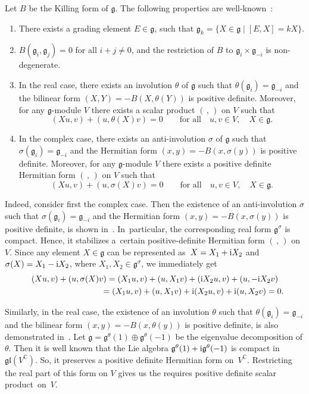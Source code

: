 \documentclass[pdftex]{sigma}%
\newcommand{\C}{\mathbb C}
\newcommand{\g}{\mathfrak g}
\newcommand{\gl}{\mathfrak{gl}}
\newcommand{\V}{V}
\numberwithin{equation}{section}
\begin{document}
\smallskip
Let $B$ be the Killing form of $\g$. The following properties are well-known~\cite{capslovak}:
\begin{enumerate}\itemsep=0pt
	\item There exists a grading element $E\in \g$, such that $\g_k=\{X\in\g\mid
	[E,X]=kX\}$.
	\item $B(\g_i,\g_j)=0$ for all $i+j\ne0$, and the restriction of $B$ to
	$\g_i\times\g_{-i}$ is non-degenerate.
	\item In the real case, there exists an involution $\theta$ of $\g$
	such that $\theta(\g_i)=\g_{-i}$ and the bilinear form $(X,Y)=-B(X,\theta(Y))$
	is positive definite. Moreover, for any $\g$-module $\V$ there exists a scalar
	product $(\,,\,)$ on $\V$ such that
	\[
	(Xu,v) + (u,\theta(X)v) = 0\qquad\text{for all}\quad u,v\in V,\quad X \in\g.
	\]
	\item In the complex case, there exists an anti-involution $\sigma$ of $\g$ such that
	$\sigma(\g_i)=\g_{-i}$ and the Hermitian form $(x,y)=-B(x,\sigma(y))$ is
	positive definite. Moreover, for any $\g$-module $\V$ there exists a positive
	definite Hermitian form $(\,,\,)$ on $\V$ such that
	\[
	(Xu,v) + (u,\sigma(X)v) = 0\qquad\text{for all}\quad u,v\in V,\quad X \in\g.
	\]
\end{enumerate}

Indeed, consider first the complex case. Then the existence of an anti-involution $\sigma$ such that $\sigma(\g_i)=\g_{-i}$ and the Hermitian form $(x,y)=-B(x,\sigma(y))$ is positive definite, is shown in~\cite[Lemma~1.5]{tan79}. In~particular, the corresponding real form $\g^{\sigma}$ is compact. Hence, it stabilizes a~certain positive-definite Hermitian form $(\,,\,)$ on~$\V$. Since any element $X\in \g$ can be represented as~$X=X_1+{\rm i}X_2$ and $\sigma(X)=X_1-{\rm i}X_2$, where $X_1,X_2\in \g^\sigma$, we immediately get
\begin{gather*}
(Xu,v) + (u,\sigma(X)v) = (X_1u,v) + (u,X_1v) + ({\rm i}X_2u,v)+(u,-{\rm i}X_2v)
\\ \hphantom{(Xu,v) + (u,\sigma(X)v)}
{}= (X_1u,v) + (u,X_1v) + {\rm i}(X_2u,v)+{\rm i}(u,X_2v) = 0.
\end{gather*}

Similarly, in the real case, the existence of an involution $\theta$ such that $\theta(\g_i)=\g_{-i}$ and the bilinear form $(x,y)=-B(x,\theta(y))$ is positive definite, is also demonstrated in~\cite{tan79}. Let $\g=\g^\theta(1)\oplus\g^\theta(-1)$ be the eigenvalue decomposition of $\theta$. Then it is well known that the Lie algebra $\g^\theta(1)+{\rm i}\g^\theta(-1)$ is compact in $\gl(\V^{\C})$. So, it preserves a positive definite Hermitian form on~$\V^{\C}$. Restricting the real part of this form on $\V$ gives us the requires positive definite scalar pro\-duct~on~$\V$.
\end{document}
